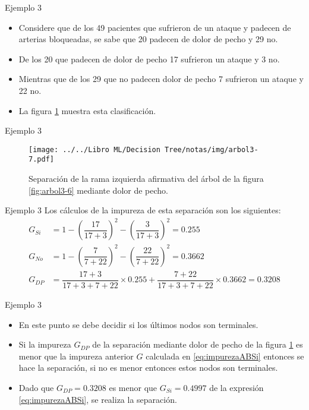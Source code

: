 \documentclass[11pt,aspectratio=169]{beamer}
\begin{document}
\begin{frame}{Ejemplo 3}
	\begin{itemize}
		\item Considere que de los 49 pacientes que sufrieron de un ataque y padecen de arterias bloqueadas, 
			se sabe que 20 padecen de dolor de pecho y 29 no.\pause
		\item De los 20 que padecen de dolor de pecho 17 sufrieron un ataque y 3 no. \pause
		\item Mientras que de los 29 que no padecen dolor de pecho 7 sufrieron un ataque y 22 no.\pause
		\item La figura \ref{fig:arbol3-7} muestra esta clasificación.
	\end{itemize}
\end{frame}

\begin{frame}{Ejemplo 3}
	\begin{figure}[H]
		\centering
		\texttt{[image: ../../Libro ML/Decision Tree/notas/img/arbol3-7.pdf]}
		\caption{Separación de la rama izquierda afirmativa del árbol de la figura \ref{fig:arbol3-6} mediante dolor de pecho.}
		\label{fig:arbol3-7}
	\end{figure}
\end{frame}

\begin{frame}{Ejemplo 3}
	Los cálculos de la impureza de esta separación son los siguientes:\pause
	\begin{align*}
		G_{Si} &= 1 - \left(\dfrac{17}{17+3}\right)^2 - \left(\dfrac{3}{17+3}\right)^2 = 0.255\\
		G_{No} &= 1 - \left(\dfrac{7}{7+22}\right)^2 - \left(\dfrac{22}{7+22}\right)^2 = 0.3662\\
		G_{DP} &= \dfrac{17+3}{17+3+7+22}\times 0.255 + \dfrac{7+22}{17+3+7+22}\times 0.3662 = 0.3208
	\end{align*}
\end{frame}

\begin{frame}{Ejemplo 3}
	\begin{itemize}
		\item En este punto se debe decidir si los últimos nodos son terminales. \pause
		\item Si la impureza $G_{DP}$ de la separación mediante dolor de pecho de la figura \ref{fig:arbol3-7} es menor 
			que la impureza anterior $G$ calculada en \ref{eq:impurezaABSi} entonces se hace la separación, 
			si no es menor entonces estos nodos son terminales. \pause 
		\item Dado que $G_{DP}=0.3208$ es menor que $G_{Si}=0.4997$ de la expresión \ref{eq:impurezaABSi}, se realiza la separación.
	\end{itemize}
\end{frame}
\end{document}
